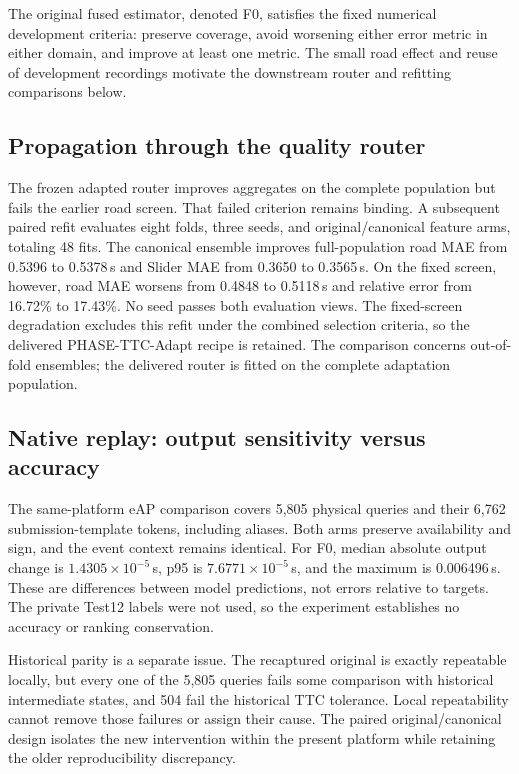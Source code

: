 The original fused estimator, denoted F0, satisfies the fixed numerical development criteria: preserve coverage, avoid worsening either error metric in either domain, and improve at least one metric. The small road effect and reuse of development recordings motivate the downstream router and refitting comparisons below.

\subsection{Propagation through the quality router}
The frozen adapted router improves aggregates on the complete population but fails the earlier road screen. That failed criterion remains binding. A subsequent paired refit evaluates eight folds, three seeds, and original/canonical feature arms, totaling 48 fits. The canonical ensemble improves full-population road MAE from 0.5396 to 0.5378\,s and Slider MAE from 0.3650 to 0.3565\,s. On the fixed screen, however, road MAE worsens from 0.4848 to 0.5118\,s and relative error from 16.72\% to 17.43\%. No seed passes both evaluation views. The fixed-screen degradation excludes this refit under the combined selection criteria, so the delivered PHASE-TTC-Adapt recipe is retained. The comparison concerns out-of-fold ensembles; the delivered router is fitted on the complete adaptation population. 

\subsection{Native replay: output sensitivity versus accuracy}
The same-platform eAP comparison covers 5,805 physical queries and their 6,762 submission-template tokens, including aliases. Both arms preserve availability and sign, and the event context remains identical. For F0, median absolute output change is $1.4305\times10^{-5}$\,s, p95 is $7.6771\times10^{-5}$\,s, and the maximum is 0.006496\,s. These are differences between model predictions, not errors relative to targets. The private Test12 labels were not used, so the experiment establishes no accuracy or ranking conservation. 

Historical parity is a separate issue. The recaptured original is exactly repeatable locally, but every one of the 5,805 queries fails some comparison with historical intermediate states, and 504 fail the historical TTC tolerance. Local repeatability cannot remove those failures or assign their cause. The paired original/canonical design isolates the new intervention within the present platform while retaining the older reproducibility discrepancy.


